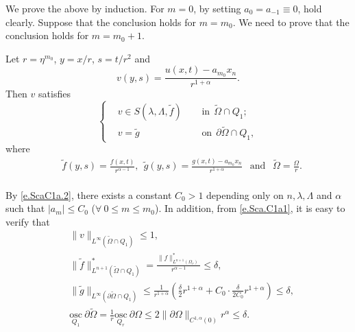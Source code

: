 \documentclass[preprint,12pt]{elsarticle}
\theoremstyle{definition}
\theoremstyle{remark}
\numberwithin{equation}{section}
\begin{document}
We prove the above by induction. For $m=0$, by setting $a_0=a_{-1}\equiv 0$,  hold clearly. Suppose that the conclusion holds for $m=m_0$. We need to prove that the conclusion holds for $m=m_0+1$.

Let $r=\eta ^{m_0}$, $y=x/r$, $s=t/r^2$ and
\begin{equation}\label{e.Sca.C1a.v}
  v(y,s)=\frac{u(x,t)-a_{m_0}x_n}{r^{1+\alpha}}.
\end{equation}
Then $v$ satisfies
\begin{equation}\label{e.Sca.C1a.v2}
\left\{\begin{aligned}
&v\in S(\lambda,\Lambda,\tilde{f})&& ~~\mbox{in}~~\tilde{\Omega}\cap Q_1;\\
&v=\tilde{g}&& ~~\mbox{on}~~\partial \tilde{\Omega}\cap Q_1,
\end{aligned}\right.
\end{equation}
where
\begin{equation*}\label{e.Sca.C1a.v3}
  \begin{aligned}
&\tilde{f}(y,s)=\frac{f(x,t)}{r^{\alpha-1}},~~\tilde{g}(y,s)=\frac{g(x,t)-a_{m_0}x_n}{r^{1+\alpha}}
~~\mbox{ and }~~\tilde{\Omega}=\frac{\Omega}{r}.\\
  \end{aligned}
\end{equation*}

By \cref{e.ScaC1a.2}, there exists a constant $C_0>1$ depending only on $n,\lambda,\Lambda$ and $\alpha$ such that $|a_m|\leq C_0$ ($\forall~0\leq m\leq m_0$). In addition, from \cref{e.Sca.C1a1}, it is easy to verify that
\begin{equation*}
\begin{aligned}
&\|v\|_{L^{\infty}(\tilde{\Omega}\cap Q_1)}\leq 1,\\
&\|\tilde{f}\|^*_{L^{n+1}(\tilde{\Omega}\cap Q_{1})}=\frac{\|f\|^*_{L^{n+1}(\Omega_r)}}{r^{\alpha-1}}\leq \delta,\\
&\|\tilde{g}\|_{L^{\infty}(\partial \tilde \Omega \cap Q_1)}
\leq \frac{1}{r^{1+\alpha}}\left(\frac{\delta}{2}r^{1+\alpha}+C_0\cdot \frac{\delta}{2C_0}r^{1+\alpha}\right)
\leq \delta,\\
 &\underset{Q_1}{\mathrm{osc}}~\partial\tilde{\Omega}=
\frac{1}{r}\underset{Q_r}{\mathrm{osc}}~\partial\Omega \leq 2\|\partial \Omega\|_{C^{1,\alpha}(0)}r^{\alpha} \leq \delta.
\end{aligned}
\end{equation*}
\end{document}

